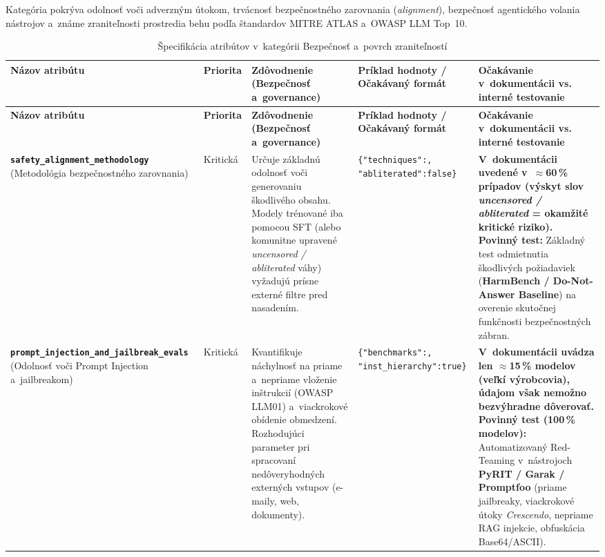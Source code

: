 Kategória pokrýva odolnosť voči adverzným útokom, trvácnosť bezpečnostného
zarovnania (\emph{alignment}), bezpečnosť agentického volania nástrojov a~známe
zraniteľnosti prostredia behu podľa štandardov MITRE ATLAS a~OWASP LLM Top~10.

{\footnotesize{}
\setlength{\tabcolsep}{4pt}
\begin{xltabular}{\textwidth}{@{}>{\raggedright\arraybackslash}p{2.6cm}>{\raggedright\arraybackslash}p{1.5cm}>{\raggedright\arraybackslash}X>{\raggedright\arraybackslash}p{3.1cm}>{\raggedright\arraybackslash}X@{}}
\caption{Špecifikácia atribútov v~kategórii Bezpečnosť a~povrch zraniteľností}
\label{tab:kat-bezpecnost} \\
\toprule
\textbf{Názov atribútu} & \textbf{Priorita} & \textbf{Zdôvodnenie (Bezpečnosť a~governance)} & \textbf{Príklad hodnoty / Očakávaný formát} & \textbf{Očakávanie v~dokumentácii vs. interné testovanie} \\
\midrule
\endfirsthead
\toprule
\textbf{Názov atribútu} & \textbf{Priorita} & \textbf{Zdôvodnenie (Bezpečnosť a~governance)} & \textbf{Príklad hodnoty / Očakávaný formát} & \textbf{Očakávanie v~dokumentácii vs. interné testovanie} \\
\midrule
\endhead
\bottomrule
\endfoot

\textbf{\texttt{safety\_\allowbreak alignment\_\allowbreak methodology}} \newline (Metodológia bezpečnostného zarovnania) &
Kritická &
Určuje základnú odolnosť voči generovaniu škodlivého obsahu. Modely trénované iba pomocou SFT (alebo komunitne upravené \emph{uncensored / abliterated} váhy) vyžadujú prísne externé filtre pred nasadením. &
\texttt{\{"techniques":, "abliterated":\allowbreak false\}} &
\textbf{V~dokumentácii uvedené v~$\approx$60\,\% prípadov (výskyt slov \emph{uncensored / abliterated} = okamžité kritické riziko).} \textbf{Povinný test:} Základný test odmietnutia škodlivých požiadaviek (\textbf{HarmBench / Do-Not-Answer Baseline}) na overenie skutočnej funkčnosti bezpečnostných zábran. \\
\midrule

\textbf{\texttt{prompt\_\allowbreak injection\_\allowbreak and\_\allowbreak jailbreak\_\allowbreak evals}} \newline (Odolnosť voči Prompt Injection a~jailbreakom) &
Kritická &
Kvantifikuje náchylnosť na priame a~nepriame vloženie inštrukcií (OWASP LLM01) a~viackrokové obídenie obmedzení. Rozhodujúci parameter pri spracovaní nedôveryhodných externých vstupov (e-maily, web, dokumenty). &
\texttt{\{"benchmarks":, "inst\_hierarchy":\allowbreak true\}} &
\textbf{V~dokumentácii uvádza len $\approx$15\,\% modelov (veľkí výrobcovia), údajom však nemožno bezvýhradne dôverovať.} \textbf{Povinný test (100\,\% modelov):} Automatizovaný Red-Teaming v~nástrojoch \textbf{PyRIT / Garak / Promptfoo} (priame jailbreaky, viackrokové útoky \emph{Crescendo}, nepriame RAG injekcie, obfuskácia Base64/ASCII). \\
\midrule


\end{xltabular}}

